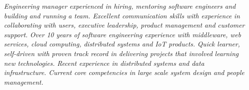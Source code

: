 {\selectfont
\textit{Engineering manager experienced in hiring, mentoring software engineers and building and running a team. Excellent communication skills with experience in collaborating with users, executive leadership, product management and customer support. Over 10 years of software engineering experience with middleware, web services, cloud computing, distributed systems and IoT products. Quick learner, self-driven with proven track record in delivering projects that involved learning new technologies. Recent experience in distributed systems and data infrastructure. Current core competencies in large scale system design and people management.}
}